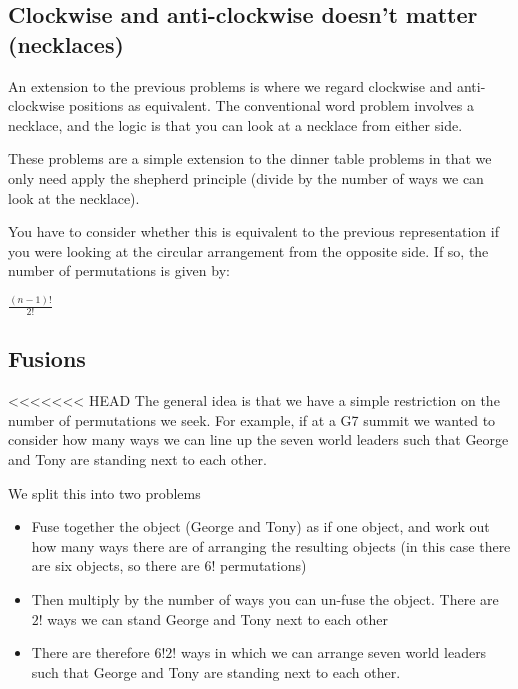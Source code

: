 \documentclass[12pt]{extbook}
\begin{document}
\subsection{Clockwise and anti-clockwise doesn't matter (necklaces)}

An extension to the previous problems is where we regard clockwise and anti-clockwise positions as equivalent.   The conventional word problem involves a necklace, and the logic is that you can look at a necklace from either side.   

These problems are a simple extension to the dinner table problems in that we only need apply the shepherd principle (divide by the number of ways we can look at the necklace).


You have to consider whether this is equivalent to the previous representation if you were looking at the circular arrangement from the opposite side.   If so, the number of permutations is given by:

$\frac{(n-1)!}{2!}$


\subsection{Fusions}

<<<<<<< HEAD
The general idea is that we have a simple restriction on the number of permutations we seek.   For example, if at a G7 summit we wanted to consider how many ways we can line up the seven world leaders such that George and Tony are standing next to each other.

We split this into two problems
\begin{itemize}
\item Fuse together the object (George and Tony) as if one object, and work out how many ways there are of arranging the resulting objects (in this case there are six objects, so there are $6!$ permutations)
\item Then multiply by the number of ways you can un-fuse the object.   There are $2!$ ways we can stand George and Tony next to each other
\item There are therefore $6!2!$ ways in which we can arrange seven world leaders such that George and Tony are standing next to each other.
\end{itemize}
\end{document}
